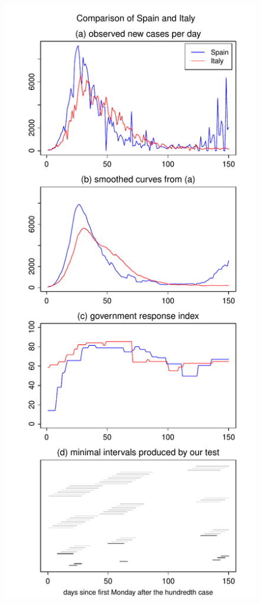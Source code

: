 \documentclass[a4paper,12pt]{article}
\numberwithin{equation}{section}
\begin{document}
\begin{figure}[h!]
\begin{minipage}[t]{0.49\textwidth}
\includegraphics[width=\textwidth]{plots/ESP_vs_ITA_Monday}

\end{minipage}
\end{figure}
\end{document}
